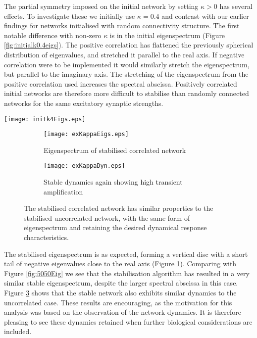 \documentclass[12pt, a4paper]{article}
\begin{document}
The partial symmetry imposed on the initial network by setting $\kappa > 0$ has several effects.  To investigate these we initially use $\kappa = 0.4$ and contrast with our earlier findings for networks initialised with random connectivity structure.  The first notable difference with non-zero $\kappa$ is in the initial eigenspectrum (Figure \ref{fig:initialk0.4eigs}).  The positive correlation has flattened the previously spherical distribution of eigenvalues, and stretched it parallel to the real axis. If negative correlation were to be implemented it would similarly stretch the eigenspectrum, but parallel to the imaginary axis.  The stretching of the eigenspectrum from the positive correlation used increases the spectral abscissa.  Positively correlated initial networks are therefore more difficult to stabilise than randomly connected networks for the same excitatory synaptic strengths.

\begin{SCfigure}
            \texttt{[image: initk4Eigs.eps]}
            \caption{Elliptical eigenspectrum resulting from positive correlation in the generation of the reference matrix.  The major axis of the ellipse lies parallel to the real axis for positive correlation, and parallel to the imaginary axis for negative correlation.}
            \label{fig:initialk0.4eigs}
\end{SCfigure}

\begin{figure}[THB]
    \begin{subfigure}{0.5\textwidth}
        \texttt{[image: exKappaEigs.eps]}
        \caption{Eigenspectrum of stabilised correlated network}
        \label{fig:k0.4eigs}
    \end{subfigure}
    \begin{subfigure}{0.5\textwidth}
        \texttt{[image: exKappaDyn.eps]}
        \caption{Stable dynamics again showing high transient amplification}
        \label{fig:k0.4Dyn}
    \end{subfigure}
    \caption{The stabilised correlated network has similar properties to the stabilised uncorrelated network, with the same form of eigenspectrum and retaining the desired dynamical response characteristics.}
\end{figure}


The stabilised eigenspectrum is as expected, forming a vertical disc with a short tail of negative eigenvalues close to the real axis (Figure \ref{fig:k0.4eigs}).  Comparing with Figure \ref{fig:5050Eig} we see that the stabilisation algorithm has resulted in a very similar stable eigenspectrum, despite the larger spectral abscissa in this case.  Figure \ref{fig:k0.4Dyn} shows that the stable network also exhibits similar dynamics to the uncorrelated case.  These results are encouraging, as the motivation for this analysis was based on the observation of the network dynamics.  It is therefore pleasing to see these dynamics retained when further biological considerations are included.
\end{document}

